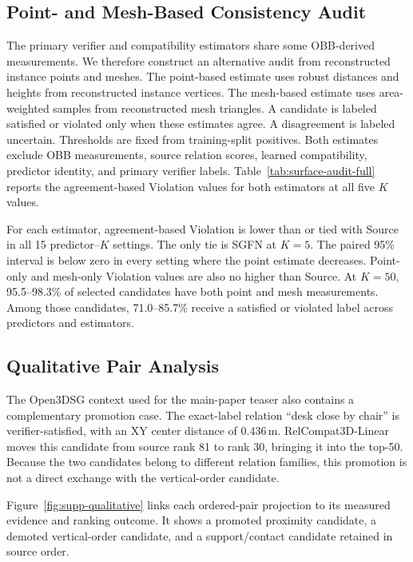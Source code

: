\subsection{Point- and Mesh-Based Consistency Audit}
The primary verifier and compatibility estimators share some OBB-derived measurements. We therefore construct an alternative audit from reconstructed instance points and meshes. The point-based estimate uses robust distances and heights from reconstructed instance vertices. The mesh-based estimate uses area-weighted samples from reconstructed mesh triangles. A candidate is labeled satisfied or violated only when these estimates agree. A disagreement is labeled uncertain. Thresholds are fixed from training-split positives. Both estimates exclude OBB measurements, source relation scores, learned compatibility, predictor identity, and primary verifier labels. Table~\ref{tab:surface-audit-full} reports the agreement-based Violation values for both estimators at all five $K$ values.

For each estimator, agreement-based Violation is lower than or tied with Source in all 15 predictor--$K$ settings. The only tie is SGFN at $K=5$. The paired 95\% interval is below zero in every setting where the point estimate decreases. Point-only and mesh-only Violation values are also no higher than Source. At $K=50$, 95.5--98.3\% of selected candidates have both point and mesh measurements. Among those candidates, 71.0--85.7\% receive a satisfied or violated label across predictors and estimators.

\subsection{Qualitative Pair Analysis}

The Open3DSG context used for the main-paper teaser also contains a complementary promotion case. The exact-label relation ``desk close by chair'' is verifier-satisfied, with an XY center distance of \(0.436\,\mathrm{m}\). RelCompat3D-Linear moves this candidate from source rank 81 to rank 30, bringing it into the top-50. Because the two candidates belong to different relation families, this promotion is not a direct exchange with the vertical-order candidate.

Figure~\ref{fig:supp-qualitative} links each ordered-pair projection to its measured evidence and ranking outcome. It shows a promoted proximity candidate, a demoted vertical-order candidate, and a support/contact candidate retained in source order.

